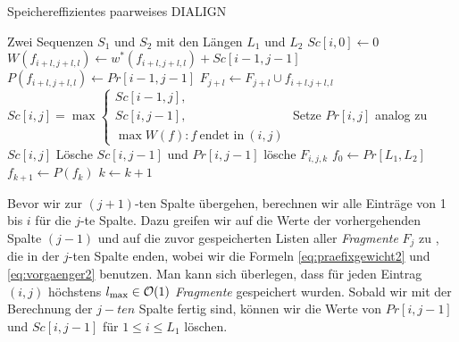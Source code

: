 \begin{algorithm}[H]
	\caption{Speichereffizientes paarweises DIALIGN}
	\label{alg:speichereffizient}
	\begin{algorithmic}[1]
		
		\Require Zwei Sequenzen $S_1$ und $S_2$ mit den Längen $L_1$ und $L_2$
		\State $Sc[i,0] \gets 0$
		\EndFor
		\label{algl:fragmentgewichte}
		\State $W(f_{i+l,j+l,l}) \gets w^*(f_{i+l,j+l,l}) + Sc[i\!-\!1,j\!-\!1]$
		\State $P(f_{i+l,j+l,l}) \gets Pr[i\!-\!1,j\!-\!1]$
		\State $F_{j+l} \gets F_{j+l} \cup {f_{i+l.j+l,l}}$\label{algl:fragmentliste}
		\EndFor
		\State
		$Sc[i,j] = \max
		\begin{cases}
		Sc[i\!-\!1,j], \\
		Sc[i,j\!-\!1], \\
		\max{W(f): f\: \text{endet in}\: (i,j)}
		\end{cases}$\label{algl:praefix}
		\State Setze $Pr[i,j]$ analog zu $Sc[i,j]$
		\State Lösche $Sc[i,j\!-\!1]$ und $Pr[i,j\!-\!1]$
		\State lösche $F_{i,j,k}$
		\EndFor
		\EndFor
		\EndFor
		\State $f_0 \gets Pr[L_1,L_2]$
		\State $f_{k+1} \gets P(f_{k})$
		\State $k \gets k+1$
		\EndWhile 
		\EndProcedure
	\end{algorithmic}
\end{algorithm}

Bevor wir zur $(j+1)$-ten Spalte übergehen, berechnen wir alle Einträge von 1 bis $i$ für die $j$-te Spalte. Dazu greifen wir auf die Werte der vorhergehenden Spalte $(j-1)$ und auf die zuvor gespeicherten Listen aller \emph{Fragmente} $F_j$ zu , die in der $j$-ten Spalte enden, wobei wir die Formeln \ref{eq:praefixgewicht2} und \ref{eq:vorgaenger2} benutzen. Man kann sich überlegen, dass für jeden Eintrag $(i,j)$ höchstens $l_{\max} \in \mathcal{O}(1)$ \emph{Fragmente} gespeichert wurden. Sobald wir mit der Berechnung der $j-ten$ Spalte fertig sind, können wir die Werte von $Pr[i,j-1]$ und $Sc[i,j-1]$ für $1 \leq i \leq L_1$ löschen.

